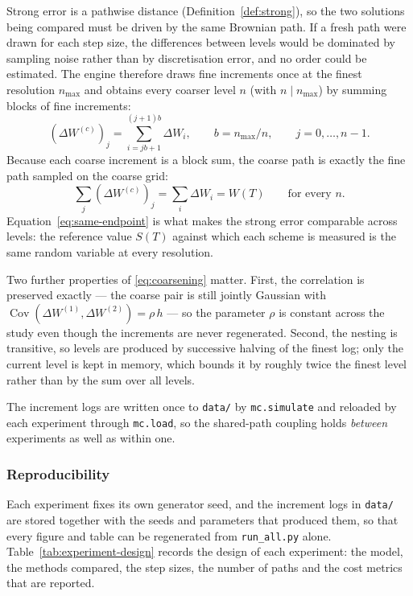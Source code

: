 \documentclass[11pt,a4paper]{article}
\theoremstyle{definition}
\theoremstyle{remark}
\begin{document}
Strong error is a pathwise distance (Definition~\ref{def:strong}), so the two
solutions being compared must be driven by the same Brownian path. If a fresh
path were drawn for each step size, the differences between levels would be
dominated by sampling noise rather than by discretisation error, and no order
could be estimated. The engine therefore draws fine increments once at the
finest resolution $n_{\max}$ and obtains every coarser level $n$ (with
$n \mid n_{\max}$) by summing blocks of fine increments:
\begin{equation}
    \left( \Delta W^{(c)} \right)_j
    = \sum_{i = j b + 1}^{(j+1) b} \Delta W_i,
    \qquad b = n_{\max} / n, \qquad j = 0, \ldots, n-1 .
    \label{eq:coarsening}
\end{equation}
Because each coarse increment is a block sum, the coarse path is exactly the
fine path sampled on the coarse grid:
\begin{equation}
    \sum_{j} \left( \Delta W^{(c)} \right)_j = \sum_{i} \Delta W_i = W(T)
    \qquad \text{for every } n .
    \label{eq:same-endpoint}
\end{equation}
Equation~\eqref{eq:same-endpoint} is what makes the strong error comparable
across levels: the reference value $S(T)$ against which each scheme is measured
is the same random variable at every resolution.

Two further properties of \eqref{eq:coarsening} matter. First, the correlation
is preserved exactly --- the coarse pair is still jointly Gaussian with
$\operatorname{Cov}\!\left( \Delta W^{(1)}, \Delta W^{(2)} \right) = \rho\, h$
--- so the parameter $\rho$ is constant across the study even though the
increments are never regenerated. Second, the nesting is transitive, so levels
are produced by successive halving of the finest log; only the current level is
kept in memory, which bounds it by roughly twice the finest level rather than by
the sum over all levels.

The increment logs are written once to \texttt{data/} by \texttt{mc.simulate}
and reloaded by each experiment through \texttt{mc.load}, so the shared-path
coupling holds \emph{between} experiments as well as within one.

\subsubsection{Reproducibility}
\label{sec:reproducibility}

Each experiment fixes its own generator seed, and the increment logs in
\texttt{data/} are stored together with the seeds and parameters that produced
them, so that every figure and table can be regenerated from
\texttt{run\_all.py} alone. Table~\ref{tab:experiment-design} records the design
of each experiment: the model, the methods compared, the step sizes, the number
of paths and the cost metrics that are reported.
\end{document}
